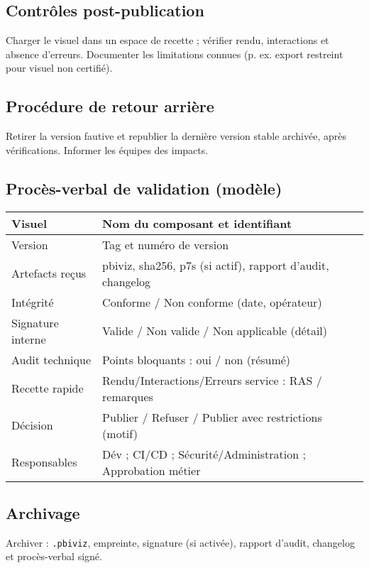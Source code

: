 \subsection{Contrôles post-publication}
Charger le visuel dans un espace de recette ; vérifier rendu, interactions et absence d’erreurs. Documenter les limitations connues (p. ex. export restreint pour visuel non certifié).

\subsection{Procédure de retour arrière}
Retirer la version fautive et republier la dernière version stable archivée, après vérifications. Informer les équipes des impacts.

\subsection*{Procès-verbal de validation (modèle)}
\begin{center}
\begin{tabular}{|p{4cm}|p{10cm}|}
\hline
Visuel & Nom du composant et identifiant \\ \hline
Version & Tag et numéro de version \\ \hline
Artefacts reçus & pbiviz, sha256, p7s (si actif), rapport d’audit, changelog \\ \hline
Intégrité & Conforme / Non conforme (date, opérateur) \\ \hline
Signature interne & Valide / Non valide / Non applicable (détail) \\ \hline
Audit technique & Points bloquants : oui / non (résumé) \\ \hline
Recette rapide & Rendu/Interactions/Erreurs service : RAS / remarques \\ \hline
Décision & Publier / Refuser / Publier avec restrictions (motif) \\ \hline
Responsables & Dév ; CI/CD ; Sécurité/Administration ; Approbation métier \\ \hline
\end{tabular}
\end{center}

\subsection{Archivage}
Archiver : \texttt{.pbiviz}, empreinte, signature (si activée), rapport d’audit, changelog et procès-verbal signé.
